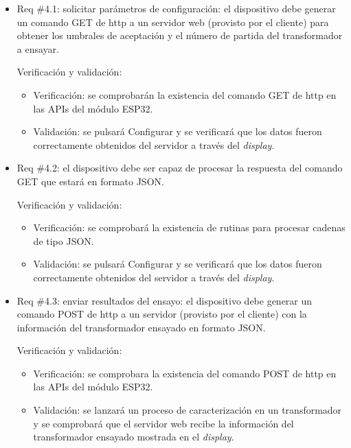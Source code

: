 \documentclass[11pt]{charter}
\begin{document}
\begin{itemize} 
\item Req \#4.1: solicitar parámetros de configuración: el dispositivo debe generar un comando GET de http a un servidor web (provisto por el cliente) para obtener los umbrales de aceptación y el número de partida del transformador a ensayar.

Verificación y validación:

\begin{itemize}
\item Verificación: se comprobarán la existencia  del comando GET de http en las APIs del módulo ESP32.
\item Validación: se pulsará Configurar y se verificará que los datos fueron correctamente obtenidos del servidor a través del \textit{display}.
\end{itemize}

\end{itemize}

\begin{itemize} 
\item Req \#4.2: el dispositivo debe ser capaz de procesar la respuesta del comando GET que estará en formato JSON.

Verificación y validación:

\begin{itemize}
\item Verificación: se comprobará la existencia de rutinas para procesar cadenas de tipo JSON.
\item Validación: se pulsará Configurar y se verificará que los datos fueron correctamente obtenidos del servidor a través del \textit{display}.
\end{itemize}

\end{itemize}

\begin{itemize} 
\item Req \#4.3: enviar resultados del ensayo: el dispositivo debe generar un comando POST de http a un servidor (provisto por el cliente) con la información del transformador ensayado en formato JSON.

Verificación y validación:

\begin{itemize}
\item Verificación: se comprobara la existencia del comando POST de http en las APIs del módulo ESP32. 
\item Validación: se lanzará un proceso de caracterización en un transformador y se comprobará que el servidor web recibe la información del transformador ensayado mostrada en el \textit{display}.
\end{itemize}

\end{itemize}
\end{document}
